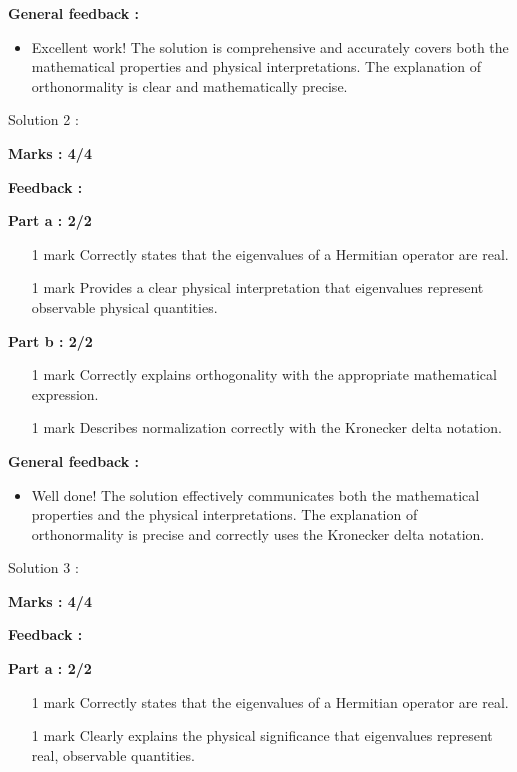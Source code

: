 \documentclass[a4paper,11pt]{article}
\begin{document}
\textbf{General feedback :}

\begin{itemize}
    \item Excellent work! The solution is comprehensive and accurately covers both the mathematical properties and physical interpretations. The explanation of orthonormality is clear and mathematically precise.
\end{itemize}


Solution 2 : 

\textbf{Marks : 4/4}

\textbf{Feedback : }

\textbf{Part a : 2/2}

\begin{itemize}
    \item [1 mark] Correctly states that the eigenvalues of a Hermitian operator are real.
    \item [1 mark] Provides a clear physical interpretation that eigenvalues represent observable physical quantities.
\end{itemize}


\textbf{Part b : 2/2}

\begin{itemize}
    \item [1 mark] Correctly explains orthogonality with the appropriate mathematical expression.
    \item [1 mark] Describes normalization correctly with the Kronecker delta notation.
\end{itemize}


\textbf{General feedback :}

\begin{itemize}
    \item Well done! The solution effectively communicates both the mathematical properties and the physical interpretations. The explanation of orthonormality is precise and correctly uses the Kronecker delta notation.
\end{itemize}


Solution 3 : 

\textbf{Marks : 4/4}

\textbf{Feedback : }

\textbf{Part a : 2/2}

\begin{itemize}
    \item [1 mark] Correctly states that the eigenvalues of a Hermitian operator are real.
    \item [1 mark] Clearly explains the physical significance that eigenvalues represent real, observable quantities.
\end{itemize}
\end{document}
